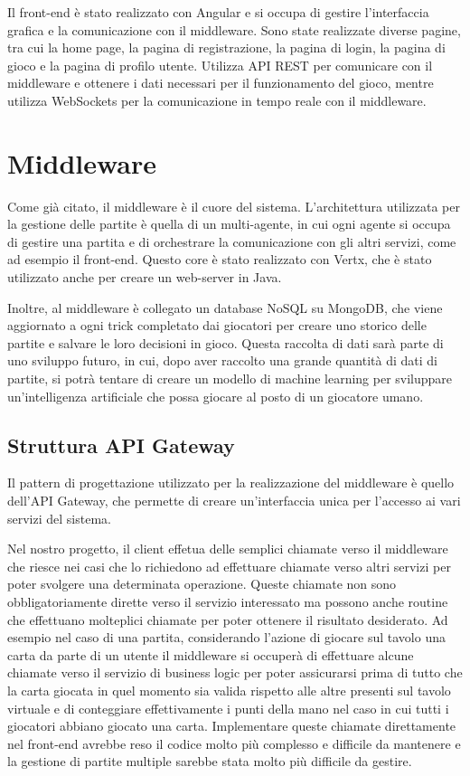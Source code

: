 Il front-end è stato realizzato con Angular e si occupa di gestire l'interfaccia grafica e la comunicazione con il middleware.
Sono state realizzate diverse pagine, tra cui la home page, la pagina di registrazione, la pagina di login, la pagina di gioco e la pagina di profilo utente.
Utilizza API REST per comunicare con il middleware e ottenere i dati necessari per il funzionamento del gioco, mentre utilizza WebSockets per la comunicazione in tempo reale con il middleware. 


\section{Middleware}

Come già citato, il middleware è il cuore del sistema. L'architettura utilizzata per la gestione delle partite è quella di un multi-agente, in cui ogni agente si occupa di gestire una partita 
e di orchestrare la comunicazione con gli altri servizi, come ad esempio il front-end. Questo core è stato realizzato con Vertx, che è stato utilizzato anche per creare un web-server in Java.

Inoltre, al middleware è collegato un database NoSQL su MongoDB, che viene aggiornato a ogni trick completato dai giocatori per creare uno storico delle partite e salvare le loro decisioni in gioco. 
Questa raccolta di dati sarà parte di uno sviluppo futuro, in cui, dopo aver raccolto una grande quantità di dati di partite, si potrà tentare di creare un modello di machine learning per sviluppare un'intelligenza artificiale che possa giocare al posto di un giocatore umano.

\subsection{Struttura API Gateway}

Il pattern di progettazione utilizzato per la realizzazione del middleware è quello dell'API Gateway, che permette di creare un'interfaccia unica per l'accesso ai vari servizi del sistema.

Nel nostro progetto, il client effetua delle semplici chiamate verso il middleware che riesce nei casi che lo richiedono ad effettuare chiamate verso altri servizi per poter svolgere una determinata operazione.
Queste chiamate non sono obbligatoriamente dirette verso il servizio interessato ma possono anche routine che effettuano molteplici chiamate per poter ottenere il risultato desiderato. 
Ad esempio nel caso di una partita, considerando l'azione di giocare sul tavolo una carta da parte di un utente il middleware si occuperà di effettuare alcune chiamate verso il servizio di business logic
per poter assicurarsi prima di tutto che la carta giocata in quel momento sia valida rispetto alle altre presenti sul tavolo virtuale e di conteggiare effettivamente i punti della mano nel 
caso in cui tutti i giocatori abbiano giocato una carta. Implementare queste chiamate direttamente nel front-end avrebbe reso il codice molto più complesso e difficile da mantenere 
e la gestione di partite multiple sarebbe stata molto più difficile da gestire.

